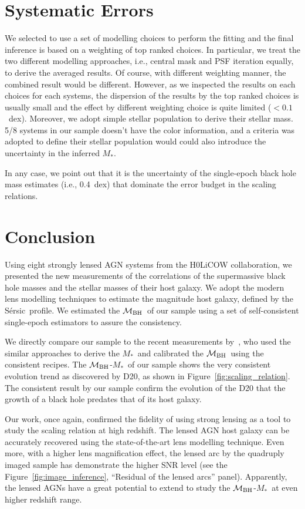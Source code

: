 \documentclass[fleqn,usenatbib]{mnras}
\newcommand{\mbh}{$\mathcal M_{\rm BH}$}
\newcommand{\sersic}{S\'ersic}
\newcommand{\mstar}{{$M_*$}}
\begin{document}
\section{Systematic Errors}\label{sec:diss}
We selected to use a set of modelling choices to perform the fitting and the final inference is based on a weighting of top ranked choices. In particular, we treat the two different modelling approaches, i.e., central mask and PSF iteration equally, to derive the averaged results. Of course, with different weighting manner, the combined result would be different. However, as we inspected the results on each choices for each systems, the dispersion of the results by the top ranked choices is usually small and the effect by different weighting choice is quite limited ($<0.1$~dex). Moreover, we adopt simple stellar population to derive their stellar mass. 5/8 systems in our sample doesn't have the color information, and a criteria was adopted to define their stellar population would could also introduce the uncertainty in the inferred \mstar.

In any case, we point out that it is the uncertainty of the single-epoch black hole mass estimates (i.e., 0.4~dex) that dominate the error budget in the scaling relations. 

\section{Conclusion}\label{sec:con}
Using eight strongly lensed AGN systems from the H0LiCOW collaboration, we presented the new measurements of the correlations of the supermassive black hole masses and the stellar masses of their host galaxy. We adopt the modern lens modelling techniques to estimate the magnitude host galaxy, defined by the \sersic\ profile. We estimated the \mbh\ of our sample using a set of self-consistent single-epoch estimators to assure the consistency.

We directly compare our sample to the recent measurements by~\citet{Ding2020a}, who used the similar approaches to derive the \mstar\ and calibrated the \mbh\ using the consistent recipes. The \mbh-\mstar\ of our sample shows the very consistent evolution trend as discovered by D20, as shown in Figure~\ref{fig:scaling_relation}. The consistent result by our sample confirm the evolution of the D20 that the growth of a black hole predates that of its host galaxy.

Our work, once again, confirmed the fidelity of using strong lensing as a tool to study the scaling relation at high redshift. The lensed AGN host galaxy can be accurately recovered using the state-of-the-art lens modelling technique. Even more, with a higher lens magnification effect, the lensed arc by the quadruply imaged sample has demonstrate the higher SNR level (see the Figure~\ref{fig:image_inference}, ``Residual of the lensed arcs'' panel). Apparently, the lensed AGNs have a great potential  to extend to study the \mbh-\mstar\ at even higher redshift range. 
\end{document}
